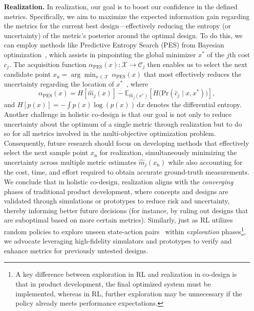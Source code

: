 \textbf{Realization.}
In realization, our goal is to boost our confidence in the defined metrics. Specifically, we aim to maximize the expected information gain regarding the metrics for the current best design—effectively reducing the entropy (or uncertainty) of the metric’s posterior around the optimal design. To do this, we can employ methods like Predictive Entropy Search (PES) from Bayesian optimization~\citep{hernandez2014predictive}, which assists in pinpointing the global minimizer $x^*$ of the $j$th cost $c_j$. The acquisition function $\alpha_\mathrm{PES}(x): \mathcal{X} \to \mathcal{C}_j$ then enables us to select the next candidate point
$x_\mathrm{n} = \arg \min_{x \in \mathcal{X}} \, \alpha_\mathrm{PES}(x)$
that most effectively reduces the uncertainty regarding the location of $x^*$~\citep{hernandez2014predictive}, where
\begin{equation}
    \alpha_\mathrm{PES}(x) = H[\hat{m}_j(x)] - \mathbb{E}_{\hat{m}_j(x^*)} \left[ H\big(\mathrm{Pr}(\hat{c}_j \mid x,x^*)\big) \right],
\end{equation}
and $H[p(x)] = -\int p(x) \log(p(x)) \, \mathrm{d}x$ denotes the differential entropy. 
Another challenge in holistic co-design is that our goal is not only to reduce uncertainty about the optimum of a single metric through realization but to do so for all metrics involved in the multi-objective optimization problem. Consequently, future research should focus on developing methods that effectively select the next sample point $x_\mathrm{n}$ for realization, simultaneously minimizing the uncertainty across multiple metric estimates $\hat{m}_j(x_\mathrm{n})$ while also accounting for the cost, time, and effort required to obtain accurate ground-truth measurements.
We conclude that in holistic co-design, realization aligns with the \emph{converging} phases of traditional product development, where concepts and designs are validated through simulations or prototypes to reduce risk and uncertainty, thereby informing better future decisions (for instance, by ruling out designs that are suboptimal based on more certain metrics). Similarly, just as \gls{RL} utilizes random policies to explore unseen state-action pairs~\citep{sutton1998reinforcement} within \emph{exploration} phases\footnote{A key difference between exploration in \gls{RL} and realization in co-design is that in product development, the final optimized system must be implemented, whereas in \gls{RL}, further exploration may be unnecessary if the policy already meets performance expectations.}, we advocate leveraging high-fidelity simulators and prototypes to verify and enhance metrics for previously untested designs.

